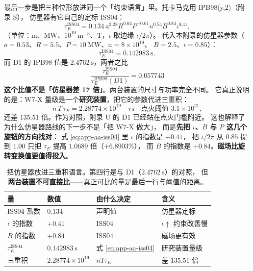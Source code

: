 最后一步是把三种位形放进同一个「约束语言」里。托卡马克用 IPB98(y,2)（附录 S），
仿星器有它自己的定标 ISS04：
\begin{equation}
\tau_E^{\mathrm{ISS04}} = 0.134\,a^{2.28}R^{0.64}P^{-0.61}
n^{0.54}B^{0.84}\iota^{0.41},
\label{eq:app-aa-iss04}
\end{equation}
（单位：$\mathrm{m}$、$\mathrm{MW}$、$10^{19}\ \mathrm{m^{-3}}$、$\mathrm{T}$，$\iota$ 取边缘 $\iota/2\pi$）。
代入本附录的仿星器参数（$a = 0.53$、$R = 5.5$、$P = 10\ \mathrm{MW}$、$n = 8\times10^{19}$、
$B = 2.5$、$\iota = 0.85$）：
\begin{equation}
\tau_E^{\mathrm{ISS04}} = 0.142983\ \mathrm{s},
\label{eq:app-aa-tauE}
\end{equation}
而 D1 的 IPB98 值是 $2.4762\ \mathrm{s}$，两者之比
\begin{equation}
\frac{\tau_E^{\mathrm{ISS04}}}{\tau_E^{\mathrm{IPB98}}(D1)} = 0.057743
\label{eq:app-aa-ratio}
\end{equation}
\textbf{这个比值不是「仿星器差 17 倍」}。两台装置的尺寸与功率完全不同。
它真正说明的是：W7-X 量级是一个\textbf{研究装置}，把它的参数代进三重积：
\begin{equation}
n\,T\,\tau_E = 2.28774\times10^{19}
\quad\text{vs}\quad
\text{点火阈值 } 3.1\times10^{21},
\label{eq:app-aa-triple}
\end{equation}
还差 $135.51$ 倍。作为对照，附录 U 的 D1 已经站在点火门槛附近。
这也解释了为什么仿星器路线的下一步不是「把 W7-X 做大」，
而是\textbf{先把 $\iota$、$B$ 与 $P$ 这几个旋钮的方向找对}：
式 \eqref{eq:app-aa-iss04} 里 $\iota$ 的指数是 $+0.41$，
把 $\iota/2\pi$ 从 $0.85$ 提到 $1.00$ 只把 $\tau_E$ 提高 $1.0689$ 倍（$+6.8903\%$），
而 $B$ 的指数是 $+0.84$。\textbf{磁场比旋转变换值更值得投入}。

\begin{table}[htbp]
\centering
\small
\caption{把仿星器放进三重积语言。第四行是与 D1（$2.4762\ \mathrm{s}$）的对照，
但\textbf{两台装置不可直接比}——真正可比的量是最后一行与阈值的距离。}
\label{tab:app-aa-scaling}
\begin{tabular}{p{3.4cm}p{3.2cm}p{3.2cm}p{3.3cm}}
\toprule
量 & 数值 & 由什么决定 & 含义 \\
\midrule
ISS04 系数 & $0.134$ & 声明值 & 仿星器定标 \\
$\iota$ 的指数 & $+0.41$ & ISS04 & $\iota\uparrow$ 约束改善慢 \\
$B$ 的指数 & $+0.84$ & ISS04 & 磁场更有效 \\
$\tau_E^{\mathrm{ISS04}}$ & $0.142983\ \mathrm{s}$ & 式 \eqref{eq:app-aa-iss04} & 研究装置量级 \\
三重积 & $2.28774\times10^{19}$ & $nT\tau_E$ & 差 $135.51$ 倍 \\
\bottomrule
\end{tabular}

\end{table}


